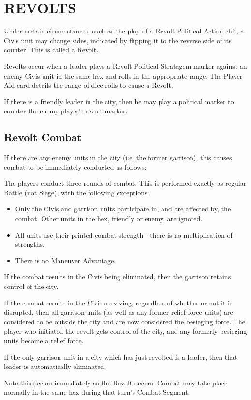 \section{REVOLTS}

Under certain circumstances, such as the play of a Revolt Political Action chit, a Civis unit may change sides, indicated by flipping it to the reverse side of its counter. This is called a Revolt.

Revolts occur when a leader plays a Revolt Political Stratagem marker against an enemy Civis unit in the same hex and rolls in the appropriate range. The Player Aid card details the range of dice rolls to cause a Revolt.

If there is a friendly leader in the city, then he may play a political marker to counter the enemy player's revolt marker.

\subsection{Revolt Combat}

If there are any enemy units in the city (i.e. the former garrison), this causes combat to be immediately conducted as follows:

The players conduct three rounds of combat. This is performed exactly as regular Battle (not Siege), with the following exceptions:

\begin{itemize}
  \item Only the Civis and garrison units participate in, and are affected by, the combat. Other units in the hex, friendly or enemy, are ignored.
  \item All units use their printed combat strength - there is no multiplication of strengths.
  \item There is no Maneuver Advantage.
\end{itemize}

If the combat results in the Civis being eliminated, then the garrison retains control of the city.

If the combat results in the Civis surviving, regardless of whether or not it is disrupted, then all garrison units (as well as any former relief force units) are considered to be outside the city and are now considered the besieging force. The player who initiated the revolt gets control of the city, and any formerly besieging units become a relief force.

If the only garrison unit in a city which has just revolted is a leader, then that leader is automatically eliminated.

Note this occurs immediately as the Revolt occurs. Combat may take place normally in the same hex during that turn's Combat Segment.
